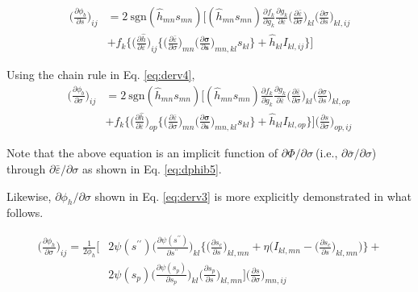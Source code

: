\documentclass[12pt]{amsart}
\begin{document}
\begin{equation}
  \label{eq:dphib_main}
  \begin{split}
    \bigg(\frac{\partial\phi_b}{\partial s}\bigg)_{ij} &= 2\ \text{sgn}(\hat{h}_{mn}s_{mn}) \bigg[(\hat{h}_{mn}s_{mn})
    \frac{\partial f_k}{\partial g_k} \frac{\partial g_k}{\partial \bar{\varepsilon}}
    \bigg(\frac{\partial\bar{\varepsilon}}{\partial\sigma}\bigg)_{kl}
    \bigg(\frac{\partial\sigma}{\partial s}\bigg)_{kl,ij} \\
    &+ f_k\bigg\{
    \bigg(\frac{\partial\hat{h}}{\partial\bar{\varepsilon}}\bigg)_{ij} \bigg\{\bigg(\frac{\partial\bar{\varepsilon}}{\partial\sigma}\bigg)_{mn}  \bigg(\frac{\partial{\mathbf{\sigma}}}{\partial{\mathbf{s}}}\bigg)_{mn,kl} s_{kl}\bigg\} + \hat{h}_{kl}I_{kl,ij}
      \bigg\}
    \bigg]
  \end{split}
\end{equation}

Using the chain rule in Eq. \ref{eq:derv4},
\begin{equation}
  \label{eq:dphib_dsig}
  \begin{split}
    \bigg(\frac{\partial\phi_b}{\partial\sigma}\bigg)_{ij} &=
    2\ \text{sgn}(\hat{h}_{mn}s_{mn}) \bigg[(\hat{h}_{mn}s_{mn})
    \frac{\partial f_k}{\partial g_k} \frac{\partial g_k}{\partial \bar{\varepsilon}}
    \bigg(\frac{\partial\bar{\varepsilon}}{\partial\sigma}\bigg)_{kl}
    \bigg(\frac{\partial\sigma}{\partial s}\bigg)_{kl,op} \\
    &+ f_k\bigg\{
    \bigg(\frac{\partial\hat{h}}{\partial\bar{\varepsilon}}\bigg)_{op} \bigg\{\bigg(\frac{\partial\bar{\varepsilon}}{\partial\sigma}\bigg)_{mn}  \bigg(\frac{\partial \mathbf{\sigma}}{\partial \mathbf{s}}\bigg)_{mn,kl} s_{kl}\bigg\} + \hat{h}_{kl}I_{kl,op}
      \bigg\}
    \bigg] \bigg(\frac{\partial s}{\partial\sigma}\bigg)_{op,ij}
  \end{split}
\end{equation}

Note that the above equation is an implicit function of $\partial\Phi/\partial\sigma\ $(i.e., $\partial\bar{\sigma}/\partial \sigma$) through $\partial\bar{\varepsilon}/\partial\sigma$ as shown in Eq. \ref{eq:dphib5}.

Likewise, $\partial\phi_h/\partial\sigma$ shown in Eq. \ref{eq:derv3} is more explicitly demonstrated in what follows.


\begin{equation}
  \label{eq:dphih_dsig}
  \begin{split}
    \Big(\frac{\partial\phi_h}{\partial\sigma}\Big)_{ij} = \frac{1}{2\phi_h}\Bigg[& 2\psi(s^{\prime\prime})\Big(\frac{\partial\psi(s^{\prime\prime})}{\partial s^{\prime\prime}}\Big)_{kl}
    \bigg\{
    \bigg( \frac{\partial s_c}{\partial s}\bigg)_{kl,mn} + \eta \bigg(I_{kl,mn} -   \bigg(\frac{\partial s_c}{\partial s}\bigg)_{kl,mn} \bigg)
    \bigg\} + \\
    & 2\psi(s_p) \Big(\frac{\partial \psi(s_p) }{\partial s_p}\Big)_{kl}
    \Big(
    \frac{\partial s_p}{\partial s}
    \Big)_{kl,mn}
    \Bigg]
    \Big(\frac{\partial s}{\partial \sigma}\Big)_{mn,ij}
  \end{split}
\end{equation}
\end{document}
